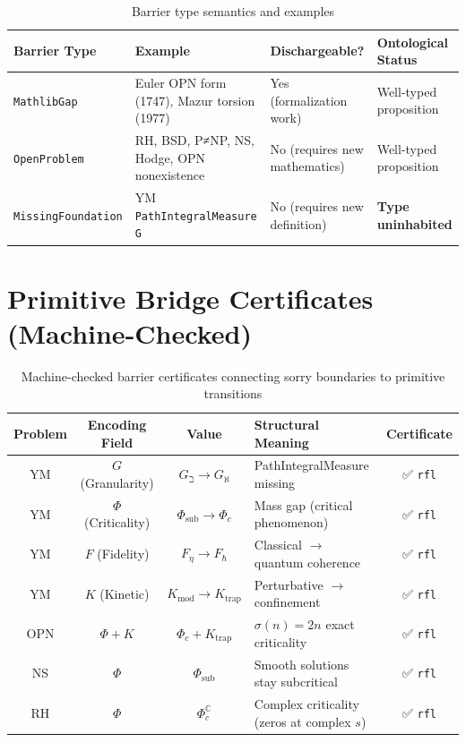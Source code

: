 \documentclass[11pt,a4paper]{article}
\begin{document}
\begin{table}[h!]
\centering
\caption{Barrier type semantics and examples}
\label{tab:barriertype}
\begin{tabular}{l l l l}
\toprule
\textbf{Barrier Type} & \textbf{Example} & \textbf{Dischargeable?} & \textbf{Ontological Status} \\
\midrule
\texttt{MathlibGap} & Euler OPN form (1747), Mazur torsion (1977) & Yes (formalization work) & Well-typed proposition \\
\texttt{OpenProblem} & RH, BSD, P≠NP, NS, Hodge, OPN nonexistence & No (requires new mathematics) & Well-typed proposition \\
\texttt{MissingFoundation} & YM \texttt{PathIntegralMeasure G} & No (requires new definition) & \textcolor{synthred}{\textbf{Type uninhabited}} \\
\bottomrule
\end{tabular}
\end{table}

\section{Primitive Bridge Certificates (Machine-Checked)}

\begin{table}[h!]
\centering
\caption{Machine-checked barrier certificates connecting sorry boundaries to primitive transitions}
\label{tab:bridge}
\begin{tabular}{c c c l c}
\toprule
\textbf{Problem} & \textbf{Encoding Field} & \textbf{Value} & \textbf{Structural Meaning} & \textbf{Certificate} \\
\midrule
YM & $G$ (Granularity) & $G_{\beth} \to G_{\aleph}$ & PathIntegralMeasure missing & ✅ \texttt{rfl} \\
YM & $\Phi$ (Criticality) & $\Phi_{\text{sub}} \to \Phi_c$ & Mass gap (critical phenomenon) & ✅ \texttt{rfl} \\
YM & $F$ (Fidelity) & $F_{\eta} \to F_{\hbar}$ & Classical $\to$ quantum coherence & ✅ \texttt{rfl} \\
YM & $K$ (Kinetic) & $K_{\text{mod}} \to K_{\text{trap}}$ & Perturbative $\to$ confinement & ✅ \texttt{rfl} \\
OPN & $\Phi + K$ & $\Phi_c + K_{\text{trap}}$ & $\sigma(n){=}2n$ exact criticality & ✅ \texttt{rfl} \\
NS & $\Phi$ & $\Phi_{\text{sub}}$ & Smooth solutions stay subcritical & ✅ \texttt{rfl} \\
RH & $\Phi$ & $\Phi_c^\mathbb{C}$ & Complex criticality (zeros at complex $s$) & ✅ \texttt{rfl} \\
\bottomrule
\end{tabular}
\end{table}
\end{document}
